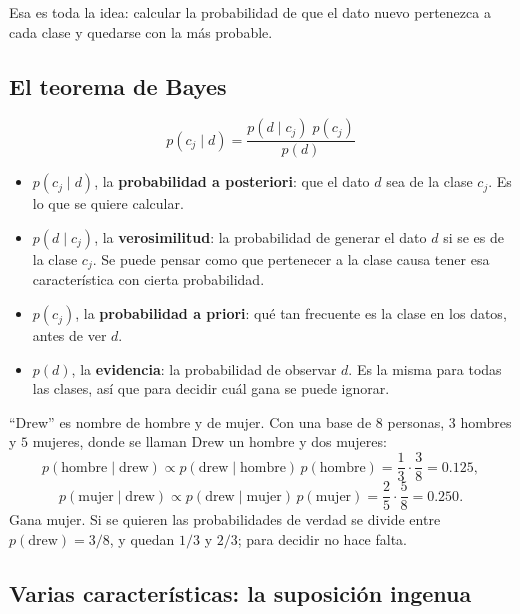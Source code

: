 \documentclass[11pt,letterpaper]{article}
\begin{document}
Esa es toda la idea: calcular la probabilidad de que el dato nuevo
pertenezca a cada clase y quedarse con la más probable.


\subsection*{El teorema de Bayes}

\[
    p(c_j \mid d) = \frac{p(d \mid c_j)\; p(c_j)}{p(d)}
\]

\begin{itemize}[itemsep=0.3em]
    \item $p(c_j \mid d)$, la \textbf{probabilidad a posteriori}: que
          el dato $d$ sea de la clase $c_j$. Es lo que se quiere
          calcular.
    \item $p(d \mid c_j)$, la \textbf{verosimilitud}: la probabilidad
          de generar el dato $d$ si se es de la clase $c_j$. Se puede
          pensar como que pertenecer a la clase causa tener esa
          característica con cierta probabilidad.
    \item $p(c_j)$, la \textbf{probabilidad a priori}: qué tan
          frecuente es la clase en los datos, antes de ver $d$.
    \item $p(d)$, la \textbf{evidencia}: la probabilidad de observar
          $d$. Es la misma para todas las clases, así que para decidir
          cuál gana se puede ignorar.
\end{itemize}

\begin{ejemplo}
    ``Drew'' es nombre de hombre y de mujer. Con una base de $8$
    personas, $3$ hombres y $5$ mujeres, donde se llaman Drew un hombre
    y dos mujeres:
    \[
        p(\text{hombre} \mid \text{drew}) \propto
        p(\text{drew} \mid \text{hombre})\, p(\text{hombre})
        = \frac{1}{3} \cdot \frac{3}{8} = 0.125 ,
    \]
    \[
        p(\text{mujer} \mid \text{drew}) \propto
        p(\text{drew} \mid \text{mujer})\, p(\text{mujer})
        = \frac{2}{5} \cdot \frac{5}{8} = 0.250 .
    \]
    Gana mujer. Si se quieren las probabilidades de verdad se divide
    entre $p(\text{drew}) = 3/8$, y quedan $1/3$ y $2/3$; para decidir
    no hace falta.
\end{ejemplo}


\subsection*{Varias características: la suposición ingenua}
\end{document}
